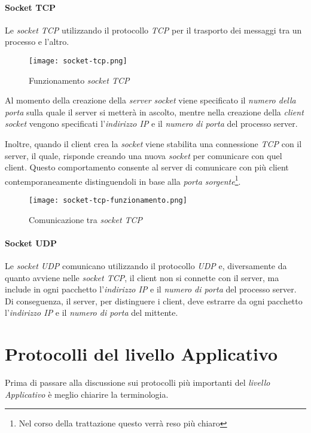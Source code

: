\paragraph{Socket TCP}
Le \emph{socket TCP} utilizzando il protocollo \emph{TCP} per il trasporto
dei messaggi tra un processo e l'altro.

\begin{figure}[ht]
    \centering
    \texttt{[image: socket-tcp.png]}
    \caption{Funzionamento \emph{socket TCP}}
\end{figure}\noindent
Al momento della creazione della \emph{server socket} viene specificato il
\emph{numero della porta} sulla quale il server si metterà in ascolto, mentre
nella creazione della \emph{client socket} vengono specificati
l'\emph{indirizzo IP} e il \emph{numero di porta} del processo server.

Inoltre, quando il client crea la \emph{socket} viene stabilita una connessione
\emph{TCP} con il server, il quale, risponde creando una nuova \emph{socket} per
comunicare con quel client. Questo comportamento consente al server di comunicare
con più client contemporaneamente distinguendoli in base alla
\emph{porta sorgente}\footnote{Nel corso della trattazione questo verrà reso
più chiaro}.

\begin{figure}[ht]
    \centering
    \texttt{[image: socket-tcp-funzionamento.png]}
    \caption{Comunicazione tra \emph{socket TCP}}
\end{figure}

\paragraph{Socket UDP}
Le \emph{socket UDP} comunicano utilizzando il protocollo \emph{UDP} e,
diversamente da quanto avviene nelle \emph{socket TCP}, il client non si connette
con il server, ma include in ogni pacchetto l'\emph{indirizzo IP} e il
\emph{numero di porta} del processo server. Di conseguenza, il server, per
distinguere i client, deve estrarre da ogni pacchetto
l'\emph{indirizzo IP} e il \emph{numero di porta} del mittente.

\section{Protocolli del livello Applicativo}
Prima di passare alla discussione sui protocolli più importanti del
\emph{livello Applicativo} è meglio chiarire la terminologia.

